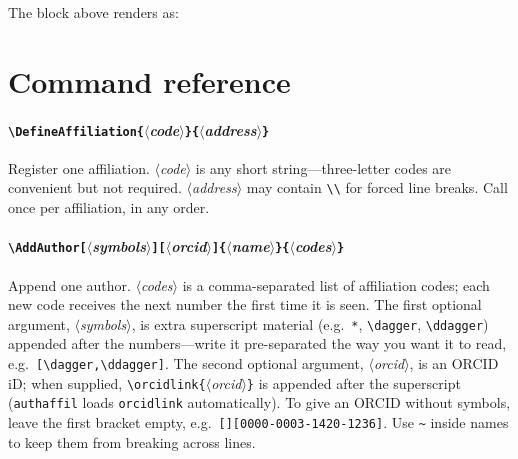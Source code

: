 \documentclass[11pt]{article}
\newcommand{\cs}[1]{\texttt{\textbackslash #1}}
\newcommand{\meta}[1]{$\langle$\textit{#1}$\rangle$}
\begin{document}
\noindent The block above renders as:


\begin{center}\end{center}

\section{Command reference}\label{sec:cmdref}

\paragraph{\cs{DefineAffiliation}\texttt{\{}\meta{code}\texttt{\}\{}\meta{address}\texttt{\}}}
Register one affiliation. \meta{code} is any short string---three-letter codes
are convenient but not required. \meta{address} may contain \cs{\textbackslash}
for forced line breaks. Call once per affiliation, in any order.

\paragraph{\cs{AddAuthor}\texttt{[}\meta{symbols}\texttt{][}\meta{orcid}\texttt{]\{}\meta{name}\texttt{\}\{}\meta{codes}\texttt{\}}}
Append one author. \meta{codes} is a comma-separated list of affiliation codes;
each new code receives the next number the first time it is seen. The first
optional argument, \meta{symbols}, is extra superscript material (e.g.\
\texttt{*}, \cs{dagger}, \cs{ddagger}) appended after the numbers---write it
pre-separated the way you want it to read, e.g.\ \texttt{[\cs{dagger},\cs{ddagger}]}.
The second optional argument, \meta{orcid}, is an ORCID iD; when supplied,
\cs{orcidlink}\texttt{\{}\meta{orcid}\texttt{\}} is appended after the
superscript (\texttt{authaffil} loads \texttt{orcidlink} automatically). To
give an ORCID without symbols, leave the first bracket empty, e.g.\
\texttt{[][0000-0003-1420-1236]}. Use \texttt{\textasciitilde} inside names to
keep them from breaking across lines.
\end{document}
